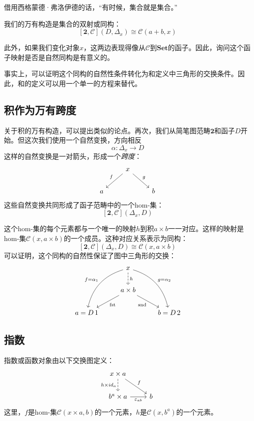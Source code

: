 \documentclass[DaoFP]{subfiles}
\begin{document}
借用西格蒙德·弗洛伊德的话，“有时候，集合就是集合。”

我们的万有构造是集合的双射或同构：
\[ [\mathbf{2}, \mathcal{C}](D, \Delta_x)  \cong \mathcal{C}(a + b, x) \]

此外，如果我们变化对象$x$，这两边表现得像从$\mathcal{C}$到$\mathbf{Set}$的函子。因此，询问这个函子映射是否是自然同构是有意义的。

事实上，可以证明这个同构的自然性条件转化为和定义中三角形的交换条件。因此，和的定义可以用一个单一的方程来替代。

\subsection{积作为万有跨度}

关于积的万有构造，可以提出类似的论点。再次，我们从简笔图范畴$\mathbf{2}$和函子$D$开始。但这次我们使用一个自然变换，方向相反
\[ \alpha \colon \Delta_x \to D \]
这样的自然变换是一对箭头，形成一个\emph{跨度}：
\[
 \begin{tikzcd}
 &x
 \arrow[dl, "f"']
 \arrow[dr, "g"]
 \\
 a
 && b
  \end{tikzcd}
\]
这些自然变换共同形成了函子范畴中的一个hom-集：
\[[\mathbf{2}, \mathcal{C}](\Delta_x, D) \]

这个hom-集的每个元素都与一个唯一的映射$h$到积$a \times b$一一对应。这样的映射是hom-集$\mathcal{C}(x, a \times b)$的一个成员。这种对应关系表示为同构：
\[ [\mathbf{2}, \mathcal{C}](\Delta_x, D)  \cong \mathcal{C}(x, a \times b) \]
可以证明，这个同构的自然性保证了图中三角形的交换：
\[
 \begin{tikzcd}
 & x
\arrow[d, dashed, "h"]
 \arrow[ddl, bend right, "f = \alpha_1"']
 \arrow[ddr, bend left, "g = \alpha_2"]
\\
&a \times b
 \arrow[dl,  "\text{fst}"]
  \arrow[dr,   "\text{snd}"']
\\
a = D\, 1 && b = D \, 2
 \end{tikzcd}
\]

\subsection{指数}

指数或函数对象由以下交换图定义：
\[
 \begin{tikzcd}
 x \times a
 \arrow[d, dashed, "h \times id_a"']
 \arrow[rd, "f"]
 \\
 b^a \times a
 \arrow[r, "\varepsilon_{a b}"']
& b
 \end{tikzcd}
\]
这里，$f$是hom-集$\mathcal{C}(x \times a, b)$的一个元素，$h$是$\mathcal{C}(x, b^a)$的一个元素。
\end{document}
